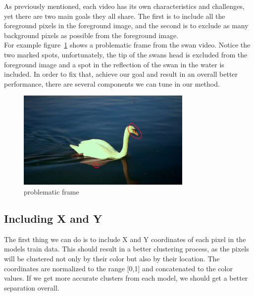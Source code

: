 As previously mentioned, each video has its own characteristics and challenges, yet there are two main goals they all share.
The first is to include all the foreground pixels in the foreground image, and the second is to exclude as many background pixels as possible from the foreground image. \\
For example figure~\ref{fig:problematic-frame} shows a problematic frame from the swan video.
Notice the two marked spots, unfortunately, the tip of the swans head is excluded from the foreground image and a spot in the reflection of the swan in the water is included.
In order to fix that, achieve our goal and result in an overall better performance, there are several components we can tune in our method.
\begin{figure}
    \centering
    \includegraphics[scale=1.8]{images/swan/example}
    \caption{problematic frame}
    \label{fig:problematic-frame}
\end{figure}

\subsection{Including X and Y}\label{subsec:xy}
The first thing we can do is to include X and Y coordinates of each pixel in the models train data.
This should result in a better clustering process, as the pixels will be clustered not only by their color but also by their location.
The coordinates are normalized to the range [0,1] and concatenated to the color values.
If we get more accurate clusters from each model, we should get a better separation overall.
